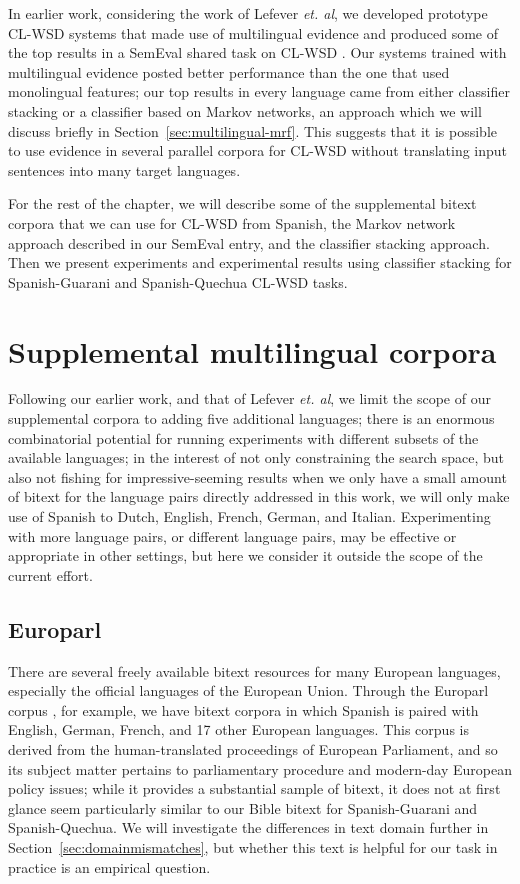 In earlier work, considering the work of Lefever \emph{et. al}, we developed
prototype CL-WSD systems that made use of multilingual evidence
\cite{rudnick-liu-gasser:2013:SemEval-2013} and produced some of the top
results in a SemEval shared task on CL-WSD \cite{task10}.
Our systems trained with multilingual evidence posted better performance than
the one that used monolingual features; our top results in every language came
from either classifier stacking or a classifier based on Markov networks,
an approach which we will discuss briefly in
Section~\ref{sec:multilingual-mrf}. This suggests that it is possible to use
evidence in several parallel corpora for CL-WSD without translating input
sentences into many target languages.

For the rest of the chapter, we will describe some of the supplemental bitext
corpora that we can use for CL-WSD from Spanish, the Markov network approach
described in our SemEval entry, and the classifier stacking approach. Then we
present experiments and experimental results using classifier stacking for
Spanish-Guarani and Spanish-Quechua CL-WSD tasks.

\section{Supplemental multilingual corpora} 

Following our earlier work, and that of Lefever \emph{et. al}, we limit the
scope of our supplemental corpora to adding five additional languages; there is
an enormous combinatorial potential for running experiments with different
subsets of the available languages; in the interest of not only constraining
the search space, but also not fishing for impressive-seeming results when we
only have a small amount of bitext for the language pairs directly addressed in
this work, we will only make use of Spanish to Dutch, English, French, German,
and Italian. Experimenting with more language pairs, or different language
pairs, may be effective or appropriate in other settings, but here we consider
it outside the scope of the current effort.

\subsection{Europarl}
There are several freely available bitext resources for many European
languages, especially the official languages of the European Union. Through the
Europarl corpus \cite{europarl}, for example, we have bitext corpora in which
Spanish is paired with English, German, French, and 17 other European
languages. This corpus is derived from the human-translated proceedings of
European Parliament, and so its subject matter pertains to parliamentary
procedure and modern-day European policy issues; while
it provides a substantial sample of bitext, it does not at first glance seem
particularly similar to our Bible bitext for Spanish-Guarani and
Spanish-Quechua. We will investigate the differences in text domain further in
Section~\ref{sec:domainmismatches}, but whether this text is helpful for our
task in practice is an empirical question.

